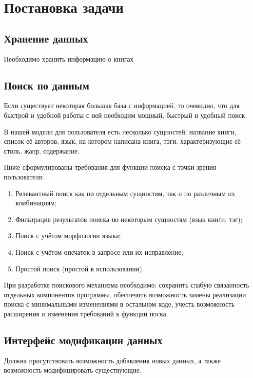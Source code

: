
\section{Постановка задачи}

\subsection{Хранение данных}

Необходимо хранить информацию о книгах

\subsection{Поиск по данным}

Если существует некоторая большая база с информацией, то очевидно, 
что для быстрой и удобной работы с ней необходим мощный, быстрый и удобный поиск.

В нашей модели для пользователя есть несколько сущностей: название книги, 
список её авторов, язык, на котором написана книга, тэги, характеризующие её стиль, жанр, содержание.

Ниже сформулированы требования для функции поиска с точки зрения пользователя:
\begin{enumerate}
  \item  Релевантный поиск как по отдельным сущностям, так и по различным их комбинациям;
  \item  Фильтрация результатов поиска по некоторым сущностям (язык книги, тэг);
  \item  Поиск с учётом морфологии языка;
  \item  Поиск с учётом опечаток в запросе или их исправление;
  \item  Простой поиск (простой в использовании).
\end{enumerate}

При разработке поискового механизма необходимо: сохранить слабую связанность отдельных компонентов программы, обеспечить возможность замены реализации поиска с минимальными изменениями в остальном коде, учесть возможность расширения и изменения требований к функции поска.


\subsection{Интерфейс модификации данных}

Должна присутствовать возможность добавления новых данных, 
а также возможность модифицировать существующие.

